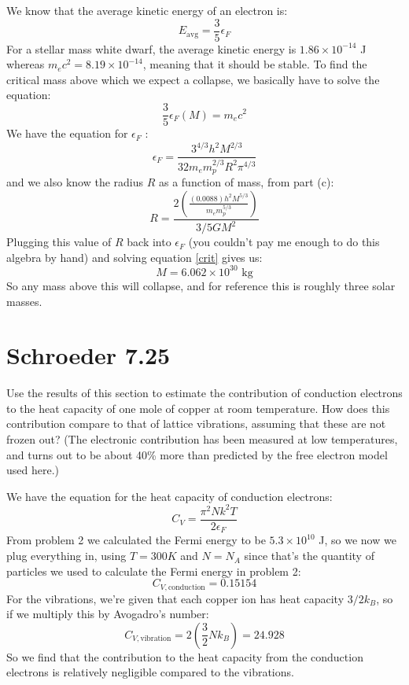 \documentclass[10pt]{article}
\begin{document}
\begin{enumerate}[label=\alph*)]
			\begin{solution}
				We know that the average kinetic energy of an electron is:
				\[
				E_{\text{avg}} = \frac{3}{5}\epsilon_F
				\] 
				For a stellar mass white dwarf, the average kinetic energy is \( 1.86 \times 10^{-14} \) J 
				whereas \( m_e c^2 = 8.19 \times 10^{-14}\), meaning that it should be stable. To find the 
				critical mass above which we expect a collapse, we basically have to solve the equation:
				\begin{equation}\label{crit}
				\frac{3}{5}\epsilon_F(M) = m_e c^2
			\end{equation} 
				We have the equation for \( \epsilon_F \) :
				\[
					\epsilon_F = \frac{3^{4 / 3} h^2M^{2 / 3}}{32 m_e m_p^{2/ 3} R^2 \pi^{4 /3}}
				\] 
				and we also know the radius \( R \) as a function of mass, from part (c):
				\[
				R = \frac{2\left( \frac{(0.0088)h^2M^{5 / 3}}{m_em_p^{5 / 3}} \right) }{3 / 5GM^2}
				\] 
				Plugging this value of \( R \) back into \( \epsilon_F \) (you couldn't pay me enough to do this 
				algebra by hand) and solving equation \ref{crit} gives us:
				\[
				M = 6.062 \times 10^{30} \text{ kg}
				\] 
				So any mass above this will collapse, and for reference this is roughly three solar masses.   
			\end{solution}
	\end{enumerate}

	\pagebreak
	\section*{Schroeder 7.25}
	Use the results of this section to estimate the contribution of conduction electrons to the heat capacity 
	of one mole of copper at room temperature. How does this contribution compare to that of 
	lattice vibrations, assuming that these are not frozen out? (The electronic contribution has been measured
	at low temperatures, and turns out to be about 40\% more than predicted by the free electron model 
	used here.) 

	\begin{solution}
		We have the equation for the heat capacity of conduction electrons:
		\[
			C_V = \frac{\pi^2Nk^2T}{2\epsilon_F}
		\] 
		From problem 2 we calculated the Fermi energy to be  \( 5.3 \times 10^{10} \) J, so we now we plug 
		everything in, using \( T = 300 K\) and \( N = N_A \) since that's the quantity of particles we used to
		calculate the Fermi energy in problem 2:
		\[
			C_{V, \text{conduction}} = 0.15154
		\] 
		For the vibrations, we're given that each copper ion has heat capacity \( 3 /2 k_B \), so if we multiply
		this by Avogadro's number:
		\[
			C_{V, \text{vibration}} = 2\left(\frac{3}{2}N k_B\right) = 24.928
		\] 
		So we find that the contribution to the heat capacity from the conduction electrons is relatively 
		negligible compared to the vibrations.
	\end{solution}
\end{document}
